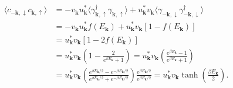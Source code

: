 \[
    \begin{aligned}
        \langle c_{-\mathbf{k},\downarrow} c_{\mathbf{k},\uparrow} \rangle & = -v_{\mathbf{k}} u_{\mathbf{k}}^* \langle \gamma_{\mathbf{k},\uparrow}^\dagger \gamma_{\mathbf{k},\uparrow} \rangle + u_{\mathbf{k}}^* v_{\mathbf{k}} \langle \gamma_{-\mathbf{k},\downarrow} \gamma_{-\mathbf{k},\downarrow}^\dagger \rangle                                                                                           \\
                                                                           & = -v_{\mathbf{k}} u_{\mathbf{k}}^* f(E_{\mathbf{k}}) + u_{\mathbf{k}}^* v_{\mathbf{k}} [1 - f(E_{\mathbf{k}})]                                                                                                                                                                                                                           \\
                                                                           & = u_{\mathbf{k}}^* v_{\mathbf{k}} [1 - 2f(E_{\mathbf{k}})]                                                                                                                                                                                                                                                                               \\
                                                                           & = u_{\mathbf{k}}^* v_{\mathbf{k}} \left( 1 - \frac{2}{e^{\beta E_{\mathbf{k}}} + 1} \right) = u_{\mathbf{k}}^* v_{\mathbf{k}} \left( \frac{e^{\beta E_{\mathbf{k}}} - 1}{e^{\beta E_{\mathbf{k}}} + 1} \right)                                                                                                                           \\
                                                                           & = u_{\mathbf{k}}^* v_{\mathbf{k}} \left( \frac{e^{\beta E_{\mathbf{k}} / 2} - e^{-\beta E_{\mathbf{k}} / 2}}{e^{\beta E_{\mathbf{k}} / 2} + e^{-\beta E_{\mathbf{k}} / 2}} \right) \frac{e^{\beta E_{\mathbf{k}} / 2}}{e^{\beta E_{\mathbf{k}} / 2}} = u_{\mathbf{k}}^* v_{\mathbf{k}} \tanh\left(\frac{\beta E_{\mathbf{k}}}{2}\right).
    \end{aligned}
\]


